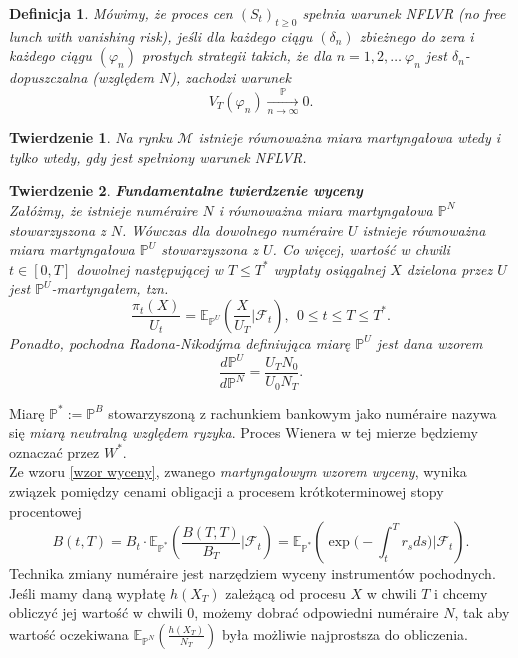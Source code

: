 \documentclass{mini}
\theoremstyle{mythstyle}
\newtheorem{Twierdzenie}{Twierdzenie}[chapter]
\newtheorem{Definicja}{Definicja}[chapter]
\begin{document}
\begin{Definicja}
	Mówimy, że proces cen $(S_t)_{t\ge 0}$ spełnia warunek NFLVR (no free lunch with vanishing risk), jeśli dla każdego ciągu $(\delta_n)$ zbieżnego do zera i każdego ciągu $(\varphi_n)$ prostych strategii takich, że 	dla $n=1,2,\ldots \ \varphi_n$ jest $\delta_n$-dopuszczalna (względem $N$), zachodzi warunek \[ V_T(\varphi_n)\xrightarrow[n\rightarrow
	\infty]{\mathbb{P}}0. \]
\end{Definicja}

\begin{Twierdzenie}
	Na rynku $\mathcal{M}$ istnieje równoważna miara martyngałowa wtedy
	i tylko wtedy, gdy jest spełniony warunek NFLVR.\\
\end{Twierdzenie}
\begin{Twierdzenie}\textbf{Fundamentalne twierdzenie wyceny}\\
	Załóżmy, że istnieje num\'{e}raire $N$ i równoważna miara
	martyngałowa $\mathbb{P}^N$ stowarzyszona z $N$. Wówczas dla
	dowolnego num\'{e}raire $U$ istnieje równoważna miara martyngałowa
	$\mathbb{P}^U$ stowarzyszona z $U$. Co więcej, wartość w chwili
	$t\in [0,T]$ dowolnej następującej w $T \leq T^*$ wypłaty osiągalnej $X$
	dzielona przez $U$ jest $\mathbb{P}^U$-martyngałem, tzn.
	\begin{equation} \label{wzor wyceny}
	\frac{\pi_t(X)}{U_t}=\mathbb{E}_{\mathbb{P}^U}
	\left(\frac{X}{U_T} \bigg| \mathcal{F}_t\right), \ \ 0\leq t \leq T \leq T^*.
	\end{equation}
	Ponadto, pochodna Radona-Nikod\'{y}ma definiująca miarę $\mathbb{P}^U$
	jest dana wzorem
	\begin{equation} \label{Radon-Nikodym}
	\frac{d\mathbb{P}^U}{d\mathbb{P}^N}=\frac{U_T N_0}{U_0 N_T}.
	\end{equation}
\end{Twierdzenie}
Miarę $\mathbb{P}^* := \mathbb{P}^B$ stowarzyszoną z rachunkiem
bankowym jako num\'{e}raire nazywa się \textit{miarą neutralną względem
	ryzyka}. Proces Wienera w tej mierze będziemy oznaczać przez $W^*$.\\ \indent
Ze wzoru \eqref{wzor wyceny}, zwanego \emph{martyngałowym wzorem wyceny}, wynika związek pomiędzy cenami obligacji a procesem krótkoterminowej stopy procentowej
\begin{equation*}
 B(t,T)=B_t \cdot \mathbb{E}_{\mathbb{P}^*}
 \left(\frac{B(T,T)}{B_T} \bigg| \mathcal{F}_t\right)=\mathbb{E}_{\mathbb{P}^*}
 \left(\exp\bigg(-\int_t^T r_sds\bigg) \bigg|\mathcal{F}_t\right).
\end{equation*}
Technika zmiany num\'{e}raire jest narzędziem wyceny instrumentów pochodnych. Jeśli mamy daną wypłatę $h(X_T)$ zależącą od procesu $X$ w chwili $T$ i chcemy obliczyć jej wartość w chwili 0, możemy dobrać odpowiedni num\'{e}raire $N$, tak aby wartość oczekiwana $\mathbb{E}_{\mathbb{P}^N} \left(\frac{h(X_T)}{N_T}\right)$ była możliwie najprostsza do obliczenia. 
\end{document}
